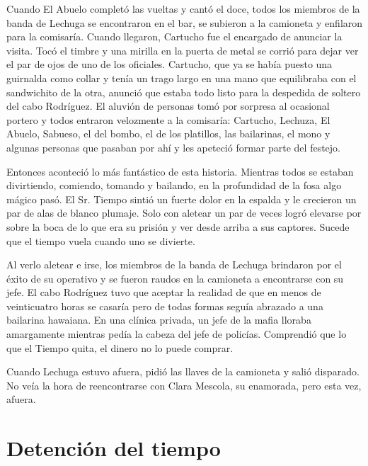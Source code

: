 \documentclass[11pt,twoside,openright,a5paper]{book}
\begin{document}
Cuando El Abuelo completó las vueltas y cantó el doce, todos los miembros de la banda de Lechuga se encontraron en el bar, se subieron a la camioneta y enfilaron para la comisaría.
Cuando llegaron, Cartucho fue el encargado de anunciar la visita. Tocó el timbre y una mirilla en la puerta de metal se corrió para dejar ver el par de ojos de uno de los oficiales. Cartucho, que ya se había puesto una guirnalda como collar y tenía un trago largo en una mano que equilibraba con el sandwichito de la otra, anunció que estaba todo listo para la despedida de soltero del cabo Rodríguez. El aluvión de personas tomó por sorpresa al ocasional portero y todos entraron velozmente a la comisaría: Cartucho, Lechuza, El Abuelo, Sabueso, el del bombo, el de los platillos, las bailarinas, el mono y algunas personas que pasaban por ahí y les apeteció formar parte del festejo.

\vspace{0.5cm}

Entonces aconteció lo más fantástico de esta historia. Mientras todos se estaban divirtiendo, comiendo, tomando y bailando, en la profundidad de la fosa algo mágico pasó. El Sr. Tiempo sintió un fuerte dolor en la espalda y le crecieron un par de alas de blanco plumaje. Solo con aletear un par de veces logró elevarse por sobre la boca de lo que era su prisión y ver desde arriba a sus captores. Sucede que el tiempo vuela cuando uno se divierte.

Al verlo aletear e irse, los miembros de la banda de Lechuga brindaron por el éxito de su operativo y se fueron raudos en la camioneta a encontrarse con su jefe. El cabo Rodríguez tuvo que aceptar la realidad de que en menos de veinticuatro horas se casaría pero de todas formas seguía abrazado a una bailarina hawaiana. En una clínica privada, un jefe de la mafia lloraba amargamente mientras pedía la cabeza del jefe de policías. Comprendió que lo que el Tiempo quita, el dinero no lo puede comprar.

\vspace{0.5cm}

Cuando Lechuga estuvo afuera, pidió las llaves de la camioneta y salió disparado. No veía la hora de reencontrarse con Clara Mescola, su enamorada, pero esta vez, afuera.

\section*{Detención del tiempo}
\end{document}
